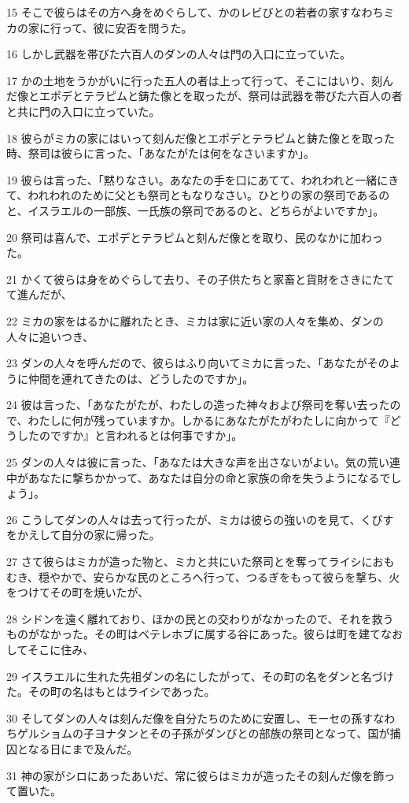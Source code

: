 \par 15 そこで彼らはその方へ身をめぐらして、かのレビびとの若者の家すなわちミカの家に行って、彼に安否を問うた。
\par 16 しかし武器を帯びた六百人のダンの人々は門の入口に立っていた。
\par 17 かの土地をうかがいに行った五人の者は上って行って、そこにはいり、刻んだ像とエポデとテラピムと鋳た像とを取ったが、祭司は武器を帯びた六百人の者と共に門の入口に立っていた。
\par 18 彼らがミカの家にはいって刻んだ像とエポデとテラピムと鋳た像とを取った時、祭司は彼らに言った、「あなたがたは何をなさいますか」。
\par 19 彼らは言った、「黙りなさい。あなたの手を口にあてて、われわれと一緒にきて、われわれのために父とも祭司ともなりなさい。ひとりの家の祭司であるのと、イスラエルの一部族、一氏族の祭司であるのと、どちらがよいですか」。
\par 20 祭司は喜んで、エポデとテラピムと刻んだ像とを取り、民のなかに加わった。
\par 21 かくて彼らは身をめぐらして去り、その子供たちと家畜と貨財をさきにたてて進んだが、
\par 22 ミカの家をはるかに離れたとき、ミカは家に近い家の人々を集め、ダンの人々に追いつき、
\par 23 ダンの人々を呼んだので、彼らはふり向いてミカに言った、「あなたがそのように仲間を連れてきたのは、どうしたのですか」。
\par 24 彼は言った、「あなたがたが、わたしの造った神々および祭司を奪い去ったので、わたしに何が残っていますか。しかるにあなたがたがわたしに向かって『どうしたのですか』と言われるとは何事ですか」。
\par 25 ダンの人々は彼に言った、「あなたは大きな声を出さないがよい。気の荒い連中があなたに撃ちかかって、あなたは自分の命と家族の命を失うようになるでしょう」。
\par 26 こうしてダンの人々は去って行ったが、ミカは彼らの強いのを見て、くびすをかえして自分の家に帰った。
\par 27 さて彼らはミカが造った物と、ミカと共にいた祭司とを奪ってライシにおもむき、穏やかで、安らかな民のところへ行って、つるぎをもって彼らを撃ち、火をつけてその町を焼いたが、
\par 28 シドンを遠く離れており、ほかの民との交わりがなかったので、それを救うものがなかった。その町はベテレホブに属する谷にあった。彼らは町を建てなおしてそこに住み、
\par 29 イスラエルに生れた先祖ダンの名にしたがって、その町の名をダンと名づけた。その町の名はもとはライシであった。
\par 30 そしてダンの人々は刻んだ像を自分たちのために安置し、モーセの孫すなわちゲルショムの子ヨナタンとその子孫がダンびとの部族の祭司となって、国が捕囚となる日にまで及んだ。
\par 31 神の家がシロにあったあいだ、常に彼らはミカが造ったその刻んだ像を飾って置いた。

